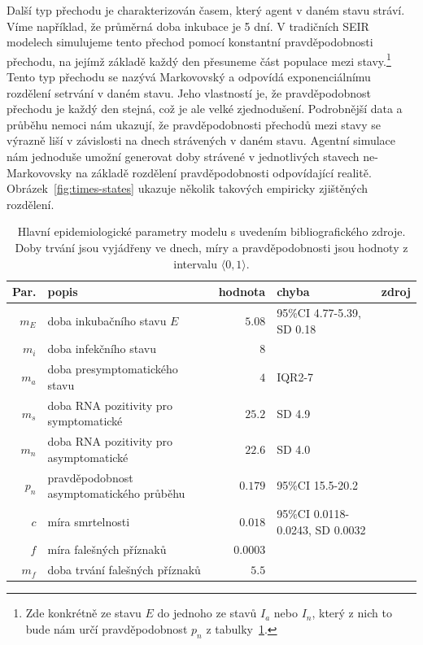 Další typ přechodu je charakterizován časem, který agent v daném stavu stráví. Víme například, že průměrná doba inkubace je 5 dní. V tradičních SEIR modelech simulujeme tento přechod pomocí konstantní pravděpodobnosti přechodu, na jejímž základě každý den přesuneme část populace mezi stavy.\footnote{Zde konkrétně ze stavu $E$ do jednoho ze stavů $I_a$ nebo $I_n$, který z nich to bude nám určí pravděpodobnost $p_n$ z tabulky~\ref{paramtab}.} Tento typ přechodu se nazývá Markovovský a odpovídá exponenciálnímu rozdělení setrvání v daném stavu. Jeho vlastností je, že pravděpodobnost přechodu je každý den stejná, což je ale velké zjednodušení. Podrobnější data a průběhu nemoci nám ukazují, že pravděpodobnosti přechodů mezi stavy se výrazně liší v závislosti na dnech strávených v daném stavu. Agentní simulace nám jednoduše umožní generovat doby strávené v jednotlivých stavech ne-Markovovsky na základě rozdělení pravděpodobnosti odpovídající realitě. Obrázek~\ref{fig:times-states} ukazuje několik takových empiricky zjištěných rozdělení.   


\begin{table} 
\begin{center}
\footnotesize
\begin{tabular}{rp{3.4cm}rp{3cm}l}
\hline
Par.&	popis &	hodnota &	chyba &	zdroj \\ \hline\hline
$m_E$&	 doba inkubačního stavu $E$ 	&$5.08$&	95\%CI 4.77-5.39, SD 0.18&	\cite{he2020estimation}	\\
$m_i$&	 doba infekčního stavu  	&$8$&	&	\cite{Wolfel2020virological}	\\
$m_a$&	 doba presymptomatického stavu 	&$4$&	IQR2-7&	\cite{nie2020epidemiological}	\\
$m_s$&	 doba RNA pozitivity pro symptomatické 	&$25.2$&	SD 4.9&	\cite{noh2020asymptomatic}	\\
$m_n$&	 doba RNA pozitivity pro asymptomatické 	&$22.6$&	SD 4.0&	\cite{noh2020asymptomatic}	\\
$p_n$&	 pravděpodobnost asymptomatického průběhu 	&$0.179$&	95\%CI 15.5-20.2&	\cite{mizumoto2020estimating}	\\
$c$&	 míra smrtelnosti 	&$0.018$&	95\%CI 0.0118-0.0243, SD 0.0032&	\cite{he2020estimation}	\\
$f$&	 míra falešných příznaků 	&$0.0003$&	&	\cite{szu2020}	\\
$m_f$&	 doba trvání falešných příznaků 	&$5.5$&	&	\cite{szu2020}	\\
\hline
\end{tabular}
\caption{Hlavní epidemiologické parametry modelu s uvedením bibliografického zdroje. Doby trvání jsou vyjádřeny ve dnech, míry a pravděpodobnosti jsou hodnoty z intervalu $\langle 0,1 \rangle$. }
\label{paramtab}
\end{center}
\end{table}

